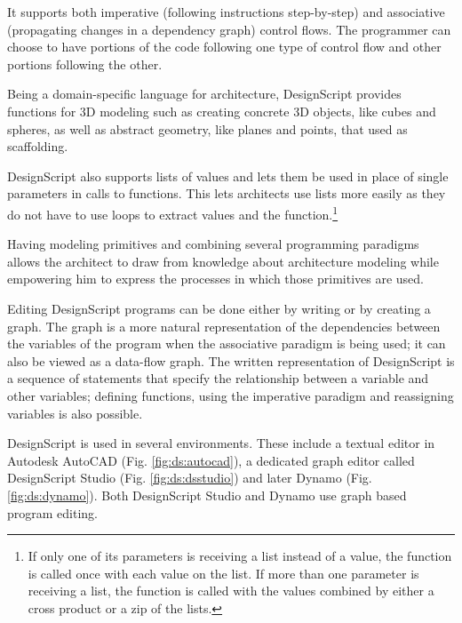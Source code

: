 It supports both imperative (following instructions step-by-step) and associative (propagating changes in a dependency graph) control flows.
The programmer can choose to have portions of the code following one type of control flow and other portions following the other.

Being a domain-specific language for architecture, DesignScript provides functions for 3D modeling such as creating concrete 3D objects, like cubes and spheres, as well as abstract geometry, like planes and points, that used as scaffolding.

DesignScript also supports lists of values and lets them be used in place of single parameters in calls to functions.
This lets architects use lists more easily as they do not have to use loops to extract values and the function.\footnote{If only one of its parameters is receiving a list instead of a value, the function is called once with each value on the list.
If more than one parameter is receiving a list, the function is called with the values combined by either a cross product or a zip of the lists.}

Having modeling primitives and combining several programming paradigms allows the architect to draw from knowledge about architecture modeling while empowering him to express the processes in which those primitives are used.

Editing DesignScript programs can be done either by writing or by creating a graph.
The graph is a more natural representation of the dependencies between the variables of the program when the associative paradigm is being used; it can also be viewed as a data-flow graph.
The written representation of DesignScript is a sequence of statements that specify the relationship between a variable and other variables; defining functions, using the imperative paradigm and reassigning variables is also possible.

DesignScript is used in several environments.
These include a textual editor in Autodesk AutoCAD (Fig. \ref{fig:ds:autocad}), a dedicated graph editor called DesignScript Studio (Fig. \ref{fig:ds:dsstudio}) and later Dynamo (Fig. \ref{fig:ds:dynamo}).
Both DesignScript Studio and Dynamo use graph based program editing.

